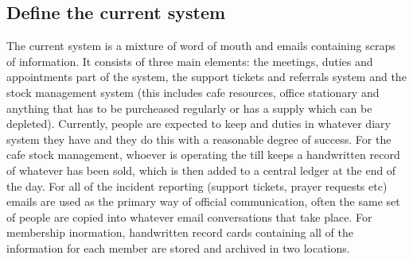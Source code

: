 \subsection{Define the current system}
	The current system is a mixture of word of mouth and emails containing scraps of information. It consists of three main elements: the meetings, duties
	and appointments part of the system, the support tickets and referrals system and the stock management system (this includes cafe resources, office
	stationary and anything that has to be purcheased regularly or has a supply which can be depleted). Currently, people are expected to keep 
	and duties in whatever diary system they have and they do this with a reasonable degree of success. For the cafe stock management, whoever
	is operating the till keeps a handwritten record of whatever has been sold, which is then added to a central ledger at the end of the day.
	For all of the incident reporting (support tickets, prayer requests etc) emails are used as the primary way of official communication, often
	the same set of people are copied into whatever email conversations that take place. For membership inormation, handwritten record cards 
	containing all of the information for each member are stored and archived in two locations.

